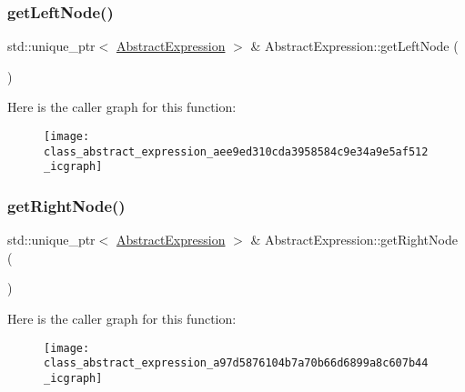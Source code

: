 \mbox{\label{class_abstract_expression_aee9ed310cda3958584c9e34a9e5af512}} 
\subsubsection{\texorpdfstring{getLeftNode()}{getLeftNode()}}
{\footnotesize\ttfamily std\+::unique\+\_\+ptr$<$ \mbox{\hyperlink{class_abstract_expression}{Abstract\+Expression}} $>$ \& Abstract\+Expression\+::get\+Left\+Node (\begin{DoxyParamCaption}{ }\end{DoxyParamCaption})}

Here is the caller graph for this function\+:
\nopagebreak
\begin{figure}[H]
\begin{center}
\leavevmode
\texttt{[image: class\_abstract\_expression\_aee9ed310cda3958584c9e34a9e5af512\_icgraph]}
\end{center}
\end{figure}
\mbox{\label{class_abstract_expression_a97d5876104b7a70b66d6899a8c607b44}} 
\subsubsection{\texorpdfstring{getRightNode()}{getRightNode()}}
{\footnotesize\ttfamily std\+::unique\+\_\+ptr$<$ \mbox{\hyperlink{class_abstract_expression}{Abstract\+Expression}} $>$ \& Abstract\+Expression\+::get\+Right\+Node (\begin{DoxyParamCaption}{ }\end{DoxyParamCaption})}

Here is the caller graph for this function\+:
\nopagebreak
\begin{figure}[H]
\begin{center}
\leavevmode
\texttt{[image: class\_abstract\_expression\_a97d5876104b7a70b66d6899a8c607b44\_icgraph]}
\end{center}
\end{figure}
\mbox{\label{class_abstract_expression_a7d80cc623cc5b47037fa95c052424b8f}} 
